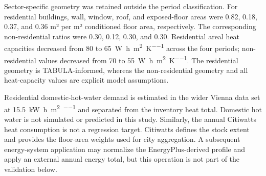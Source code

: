 \documentclass[10pt,twocolumn]{article}
\begin{document}
\begin{table}[t]
\centering
\caption{Vienna stock weights and period-dependent envelope parameters.
The U-values are common to both sectors. Residential $g$-values are
cross-TABULA proxies; the uniform non-residential value is a model assumption.}
\label{tab:cohorts}
\scriptsize
\setlength{\tabcolsep}{4.0pt}
\end{table}

Sector-specific geometry was retained outside the period classification.
For residential buildings, wall, window, roof, and exposed-floor areas were
0.82, 0.18, 0.37, and 0.36 m² per m² conditioned floor area, respectively.
The corresponding non-residential ratios were 0.30, 0.12, 0.30, and 0.30.
Residential areal heat capacities decreased from 80 to
\SI{65}{\watt\hour\per\metre\squared\per\kelvin} across the four periods;
non-residential values decreased from 70 to
\SI{55}{\watt\hour\per\metre\squared\per\kelvin}. The residential geometry is
TABULA-informed, whereas the non-residential geometry and all heat-capacity
values are explicit model assumptions.

Residential domestic-hot-water demand is estimated in the wider Vienna data
set at \SI{15.5}{\kilo\watt\hour\per\metre\squared\per\annum} and separated
from the inventory heat total. Domestic hot water is not simulated or
predicted in this study. Similarly, the annual Citiwatts heat consumption is
not a regression target. Citiwatts defines the stock extent and provides the
floor-area weights used for city aggregation. A subsequent energy-system
application may normalize the EnergyPlus-derived profile and apply an external
annual energy total, but this operation is not part of the validation below.
\end{document}
